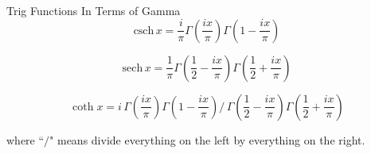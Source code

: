 \documentclass[12pt]{article}
\begin{document}
\begin{section}{Trig Functions In Terms of Gamma}
	\begin{equation}
		\text{csch}\,x=\dfrac i\pi\Gamma\left(\dfrac{ix}\pi\right)\Gamma\left(1-\dfrac{ix}\pi\right)
	\end{equation}

	\begin{equation}
		\text{sech}\,x=\dfrac1\pi\Gamma\left(\dfrac12-\dfrac{ix}\pi\right)\Gamma\left(\dfrac12+\dfrac{ix}\pi\right)
	\end{equation}

	\begin{equation}
		\coth x=i\,\Gamma\left(\dfrac{ix}\pi\right)\Gamma\left(1-\dfrac{ix}\pi\right)\big/\,\Gamma\left(\dfrac12-\dfrac{ix}\pi\right)\Gamma\left(\dfrac12+\dfrac{ix}\pi\right)
	\end{equation}

	\noindent where ``$\big/$" means divide everything on the left by everything on the right.
\end{section}
\end{document}

